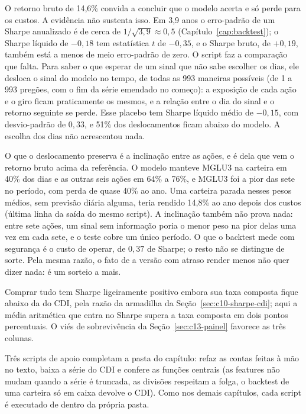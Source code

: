 O retorno bruto de 14,6\% convida a concluir que o modelo acerta e só perde para os custos. A evidência não sustenta isso. Em 3,9 anos o erro-padrão de um Sharpe anualizado é de cerca de $1/\sqrt{3,9} \approx 0,5$ (Capítulo~\ref{cap:backtest}); o Sharpe líquido de $-0,18$ tem estatística $t$ de $-0,35$, e o Sharpe bruto, de $+0,19$, também está a menos de meio erro-padrão de zero. O script  faz a comparação que falta. Para saber o que esperar de um sinal que não sabe escolher os dias, ele desloca o sinal do modelo no tempo, de todas as 993 maneiras possíveis (de 1 a 993 pregões, com o fim da série emendado no começo): a exposição de cada ação e o giro ficam praticamente os mesmos, e a relação entre o dia do sinal e o retorno seguinte se perde. Esse placebo tem Sharpe líquido médio de $-0,15$, com desvio-padrão de $0,33$, e 51\% dos deslocamentos ficam abaixo do modelo. A escolha dos dias não acrescentou nada.

O que o deslocamento preserva é a inclinação entre as ações, e é dela que vem o retorno bruto acima da referência. O modelo manteve MGLU3 na carteira em 40\% dos dias e as outras seis ações em 64\% a 76\%, e MGLU3 foi a pior das sete no período, com perda de quase 40\% ao ano. Uma carteira parada nesses pesos médios, sem previsão diária alguma, teria rendido 14,8\% ao ano depois dos custos (última linha da saída do mesmo script). A inclinação também não prova nada: entre sete ações, um sinal sem informação poria o menor peso na pior delas uma vez em cada sete, e o teste cobre um único período. O que o backtest mede com segurança é o custo de operar, de $0,37$ de Sharpe; o resto não se distingue de sorte. Pela mesma razão, o fato de a versão com atraso render menos não quer dizer nada: é um sorteio a mais.

Comprar tudo tem Sharpe ligeiramente positivo embora sua taxa composta fique abaixo da do CDI, pela razão da armadilha da Seção~\ref{sec:c10-sharpe-cdi}; aqui a média aritmética que entra no Sharpe supera a taxa composta em dois pontos percentuais. O viés de sobrevivência da Seção~\ref{sec:c13-painel} favorece as três colunas.

Três scripts de apoio completam a pasta do capítulo:  refaz as contas feitas à mão no texto,  baixa a série do CDI e  confere as funções centrais (as features não mudam quando a série é truncada, as divisões respeitam a folga, o backtest de uma carteira só em caixa devolve o CDI). Como nos demais capítulos, cada script é executado de dentro da própria pasta.

